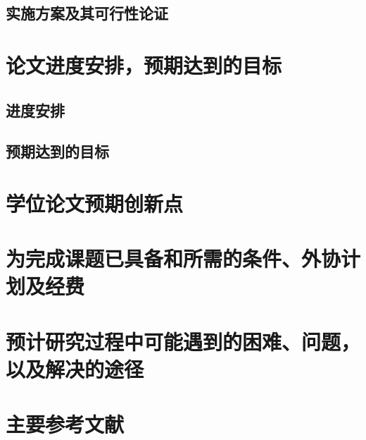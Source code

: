 \subsection{实施方案及其可行性论证}
\section{论文进度安排，预期达到的目标}
\subsection{进度安排}
\subsection{预期达到的目标}
\section{学位论文预期创新点}
\section{为完成课题已具备和所需的条件、外协计划及经费}
\section{预计研究过程中可能遇到的困难、问题，以及解决的途径}
\section{主要参考文献}



